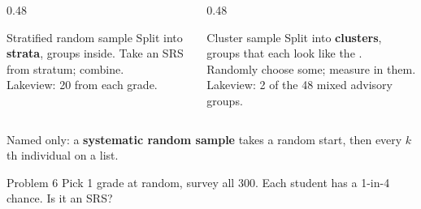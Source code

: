 \documentclass[aspectratio=169, 11pt]{beamer}
\begin{document}
\begin{frame}[t, plain]
  \vspace{2pt}
  \begin{columns}[t]
    \begin{column}{0.48\textwidth}
      \begin{block}{Stratified random sample}
        Split into \textbf{strata}, groups  inside. Take an SRS from
         stratum; combine.\\[2pt]
        {\small Lakeview: 20 from each grade.}
      \end{block}
    \end{column}
    \begin{column}{0.48\textwidth}
      \begin{block}{Cluster sample}
        Split into \textbf{clusters}, groups that each look like the .
        Randomly choose some; measure  in them.\\[2pt]
        {\small Lakeview: 2 of the 48 mixed advisory groups.}
      \end{block}
    \end{column}
  \end{columns}
  \vspace{8pt}
  {\small Named only: a \textbf{systematic random sample} takes a random start, then every
  $k$th individual on a list.}
  \vspace{6pt}
  \begin{block}{Problem 6}
    Pick 1 grade at random, survey all 300. Each student has a 1-in-4 chance. Is it an SRS?
  \end{block}
\end{frame}
\end{document}
